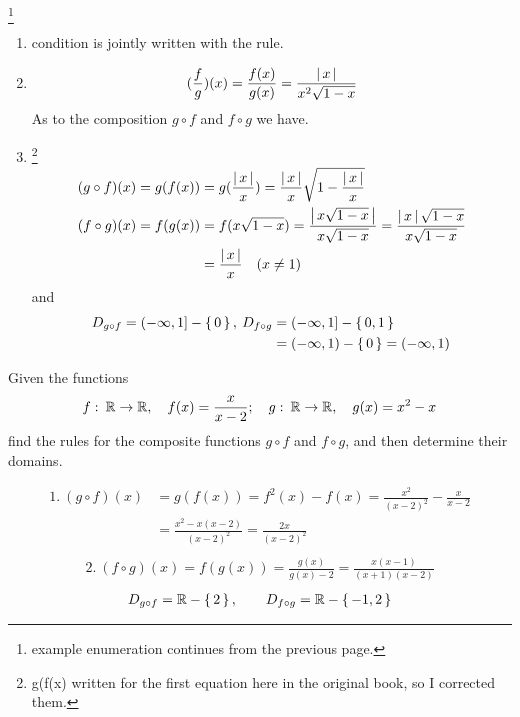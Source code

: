 \documentclass[11pt]{amsbook}
\begin{document}
\begin{exmp}
	\footnote{example enumeration continues from the previous page.}
	\begin{enumerate}
		\item condition is jointly written with the rule.
		\item \begin{align*}
			(\frac{f}{g})(x) = \frac{f(x)}{g(x)} = \frac{\left \lvert \, x \, \right \rvert}{x^{2}\sqrt{1-x}}
		\end{align*}
		As to the composition $g \circ f$ and $f \circ g$ we have.
		\item \footnote{g(f(x) written for the first equation here in the original book, so I corrected them.}
		\begin{align*}
			(g \circ f)(x) = g(f(x)) &= g(\frac{\left \lvert \, x \, \right \rvert}{x}) = \frac{\left \lvert \, x \, \right \rvert}{x}\sqrt{1-\frac{\left \lvert \, x \, \right \rvert}{x}} \\
			(f \circ g)(x) = f(g(x)) &= f(x\sqrt{1-x}) = \frac{\left \lvert \, x\sqrt{1-x} \, \right \rvert}{x\sqrt{1-x}} = \frac{\left \lvert \, x \, \right \rvert\sqrt{1-x}}{x\sqrt{1-x}} \\
			&= \frac{\left \lvert \, x \, \right \rvert}{x} \quad (x \neq 1)
		\end{align*}
		and \begin{align*}
			D_{g \circ f} = (-\infty, 1] -  \left \{ \, 0 \, \right \} , \: D_{f \circ g} &= (-\infty, 1] -  \left \{ \, 0,1 \, \right \}  \\
			&= (-\infty, 1) -  \left \{ \, 0 \, \right \}  = (-\infty, 1)
		\end{align*}
	\end{enumerate}
\end{exmp}

\begin{exmp}
	Given the functions
	\begin{align*}
		 f \, \colon \, \mathbb{R} \to \mathbb{R} , \quad f(x) = \frac{x}{x-2}; \quad  g \, \colon \, \mathbb{R} \to \mathbb{R} , \quad g(x) = x^{2}-x
	\end{align*}
	find the rules for the composite functions $g \circ f$ and $f \circ g$, and then determine their domains.
	\begin{hSolution}
		\begin{align*}
			1.\: (g \circ f)(x) &= g(f(x)) = f^{2}(x)-f(x) = \frac{x^{2}}{(x-2)^{2}} - \frac{x}{x-2} \\
			&= \frac{x^{2}-x(x-2)}{(x-2)^{2}} = \frac{2x}{(x-2)^{2}} \\
		\end{align*}
		\begin{align*}
			2.\: (f \circ g)(x) = f(g(x)) = \frac{g(x)}{g(x)-2} = \frac{x(x-1)}{(x+1)(x-2)}
		\end{align*}
		\begin{align*}
			D_{g \circ f} = \mathbb{R} -  \left \{ \, 2 \, \right \} , \qquad D_{f \circ g} = \mathbb{R} -  \left \{ \, -1, 2 \, \right \} 
		\end{align*}
	\end{hSolution}
\end{exmp}
\end{document}
